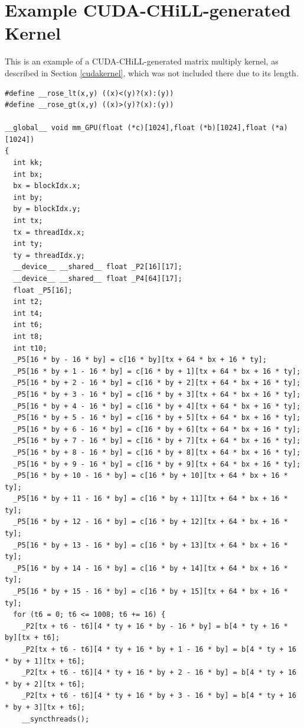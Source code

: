 \documentclass[msthesis,justified,copyright,final,numbers,sort&compress,
gsmodern,amstex,natbib]{uothesis}
\begin{document}
\chapter{Example {CUDA-CHiLL}-generated Kernel}

This is an example of a CUDA-CHiLL-generated matrix multiply kernel, as described in Section \ref{cudakernel}, which was not included there due to its length.

\lstset{language=C,breaklines=true,basicstyle=\tiny\singlespacing}
\begin{lstlisting}
#define __rose_lt(x,y) ((x)<(y)?(x):(y))
#define __rose_gt(x,y) ((x)>(y)?(x):(y))

__global__ void mm_GPU(float (*c)[1024],float (*b)[1024],float (*a)[1024])
{
  int kk;
  int bx;
  bx = blockIdx.x;
  int by;
  by = blockIdx.y;
  int tx;
  tx = threadIdx.x;
  int ty;
  ty = threadIdx.y;
  __device__ __shared__ float _P2[16][17];
  __device__ __shared__ float _P4[64][17];
  float _P5[16];
  int t2;
  int t4;
  int t6;
  int t8;
  int t10;
  _P5[16 * by - 16 * by] = c[16 * by][tx + 64 * bx + 16 * ty];
  _P5[16 * by + 1 - 16 * by] = c[16 * by + 1][tx + 64 * bx + 16 * ty];
  _P5[16 * by + 2 - 16 * by] = c[16 * by + 2][tx + 64 * bx + 16 * ty];
  _P5[16 * by + 3 - 16 * by] = c[16 * by + 3][tx + 64 * bx + 16 * ty];
  _P5[16 * by + 4 - 16 * by] = c[16 * by + 4][tx + 64 * bx + 16 * ty];
  _P5[16 * by + 5 - 16 * by] = c[16 * by + 5][tx + 64 * bx + 16 * ty];
  _P5[16 * by + 6 - 16 * by] = c[16 * by + 6][tx + 64 * bx + 16 * ty];
  _P5[16 * by + 7 - 16 * by] = c[16 * by + 7][tx + 64 * bx + 16 * ty];
  _P5[16 * by + 8 - 16 * by] = c[16 * by + 8][tx + 64 * bx + 16 * ty];
  _P5[16 * by + 9 - 16 * by] = c[16 * by + 9][tx + 64 * bx + 16 * ty];
  _P5[16 * by + 10 - 16 * by] = c[16 * by + 10][tx + 64 * bx + 16 * ty];
  _P5[16 * by + 11 - 16 * by] = c[16 * by + 11][tx + 64 * bx + 16 * ty];
  _P5[16 * by + 12 - 16 * by] = c[16 * by + 12][tx + 64 * bx + 16 * ty];
  _P5[16 * by + 13 - 16 * by] = c[16 * by + 13][tx + 64 * bx + 16 * ty];
  _P5[16 * by + 14 - 16 * by] = c[16 * by + 14][tx + 64 * bx + 16 * ty];
  _P5[16 * by + 15 - 16 * by] = c[16 * by + 15][tx + 64 * bx + 16 * ty];
  for (t6 = 0; t6 <= 1008; t6 += 16) {
    _P2[tx + t6 - t6][4 * ty + 16 * by - 16 * by] = b[4 * ty + 16 * by][tx + t6];
    _P2[tx + t6 - t6][4 * ty + 16 * by + 1 - 16 * by] = b[4 * ty + 16 * by + 1][tx + t6];
    _P2[tx + t6 - t6][4 * ty + 16 * by + 2 - 16 * by] = b[4 * ty + 16 * by + 2][tx + t6];
    _P2[tx + t6 - t6][4 * ty + 16 * by + 3 - 16 * by] = b[4 * ty + 16 * by + 3][tx + t6];
    __syncthreads();

\end{lstlisting}
\end{document}
